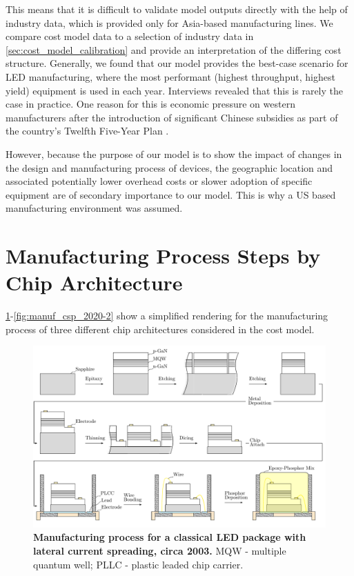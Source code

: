 \documentclass[parskip=full]{article}
\begin{document}
This means that it is difficult to validate model outputs directly with the help of industry data, which is provided only for Asia-based manufacturing lines. We compare cost model data to a selection of industry data in \cref{sec:cost_model_calibration} and provide an interpretation of the differing cost structure. Generally, we found that our model provides the best-case scenario for LED manufacturing, where the most performant (highest throughput, highest yield) equipment is used in each year. Interviews revealed that this is rarely the case in practice. One reason for this is economic pressure on western manufacturers after the introduction of significant Chinese subsidies as part of the country's Twelfth Five-Year Plan \cite{sanderson2014light}.

However, because the purpose of our model is to show the impact of changes in the design and manufacturing process of devices, the geographic location and associated potentially lower overhead costs or slower adoption of specific equipment are of secondary importance to our model. This is why a US based manufacturing environment was assumed.

\section{Manufacturing Process Steps by Chip Architecture}
\label{sec:manufacturing_steps}

\cref{fig:manuf_classical_2003}-\cref{fig:manuf_csp_2020-2} show a simplified rendering for the manufacturing process of three different chip architectures considered in the cost model.


    \begin{landscape}
        \begin{figure}
            \includegraphics[width=555pt]{./figures/classical_overview_2003.pdf}
            \caption{\textbf{Manufacturing process for a classical LED package with lateral current spreading, circa 2003.} MQW - multiple quantum well; PLLC - plastic leaded chip carrier.}
        \label{fig:manuf_classical_2003}
        \end{figure}
    \end{landscape}
    
\end{document}
